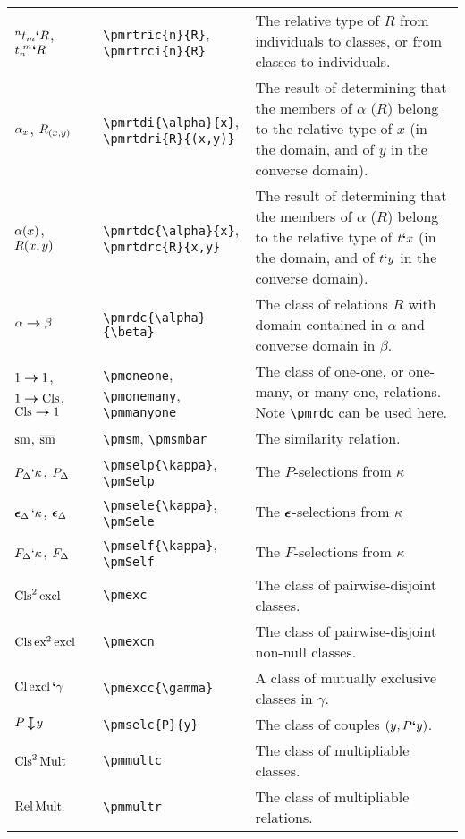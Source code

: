 \documentclass[12pt]{article}
\begin{document}
\noindent \begin{tabular}{@{}p{3cm} | p{5cm} | p{8.25cm}}
	$^{n}t_{m}\textbf{`}R$, $t_{n}^{\text{ }m}\textbf{`}R$ & \verb|\pmrtric{n}{R}|,  \verb|\pmrtrci{n}{R}| & The relative type of $R$ from individuals to classes, or from classes to individuals. \\
	$\alpha_{x}$, $R_{(x,y)}$ & \verb|\pmrtdi{\alpha}{x}|, \verb|\pmrtdri{R}{(x,y)}| & The result of determining that the members of $\alpha$ ($R$) belong to the relative type of $x$ (in the domain, and of $y$ in the converse domain). \\
	$\alpha(x)$, $R(x,y)$ & \verb|\pmrtdc{\alpha}{x}|, \verb|\pmrtdrc{R}{x,y}| & The result of determining that the members of $\alpha$ ($R$) belong to the relative type of $t\textbf{`}x$ (in the domain, and of $t\textbf{`}y$ in the converse domain). \\
	$\alpha\boldsymbol{\to}\beta$ & \verb|\pmrdc{\alpha}{\beta}| & The class of relations $R$ with domain contained in $\alpha$ and converse domain in $\beta$.  \\
	$1\boldsymbol{\to}1$, $1\boldsymbol{\to}\text{Cls}$, $\text{Cls}\boldsymbol{\to}1$ &  \verb|\pmoneone|, \verb|\pmonemany|, \verb|\pmmanyone| & The class of one-one, or one-many, or many-one, relations. Note \verb|\pmrdc| can be used here. \\
	$\mathrel{\text{sm}}$, $\mathrel{\overline{\text{sm}}}$ & \verb|\pmsm|, \verb|\pmsmbar| & The similarity relation. \\
	$P_{\small\Delta}\mathbf{`}\kappa$, $P_{\Delta}$ & \verb|\pmselp{\kappa}|, \verb|\pmSelp| &  The $P$-selections from $\kappa$ \\
	$\mathop{\boldsymbol{\epsilon}}_{\small\Delta}\mathbf{`}\kappa$, $\mathop{\boldsymbol{\epsilon}}_{\Delta}$ & \verb|\pmsele{\kappa}|, \verb|\pmSele| &  The $\mathop{\boldsymbol{\epsilon}}$-selections from $\kappa$ \\
	$F_{\small\Delta}\mathbf{`}\kappa$, $F_{\Delta}$ & \verb|\pmself{\kappa}|, \verb|\pmSelf| &  The $F$-selections from $\kappa$ \\
	$\text{Cls}^2 \mathop{\text{excl}}$ & \verb|\pmexc| & The class of pairwise-disjoint classes. \\
	$\text{Cls} \mathop{\text{ex}^2} \mathop{\text{excl}}$ & \verb|\pmexcn| & The class of pairwise-disjoint non-null classes. \\
	$\text{Cl} \mathop{\text{excl}}\textbf{`}\gamma$ & \verb|\pmexcc{\gamma}| & A class of mutually exclusive classes in $\gamma$. \\
	$\pmselc{P}{y}$ & \verb|\pmselc{P}{y}| & The class of couples $(y, P\textbf{`}y)$. \\
	$\mathop{\text{Cls}^2} \mathop{\text{Mult}}$ & \verb|\pmmultc| & The class of multipliable classes. \\
	$\mathop{\text{Rel}} \mathop{\text{Mult}}$ & \verb|\pmmultr| & The class of multipliable relations. \\

\end{tabular}
\end{document}
